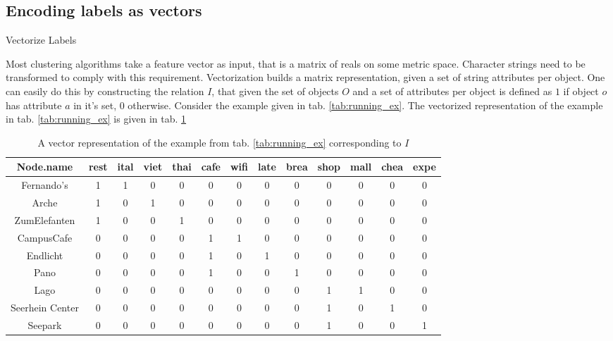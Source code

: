 \subsection{Encoding labels as vectors}
\begin{algorithm}[htp]
\caption{Vectorize Labels}\label{vect}
\end{algorithm} 
Most clustering algorithms take a feature vector as input, that is a matrix of reals on some metric space. Character strings need to be transformed to comply with this requirement. Vectorization builds a matrix representation, given a set of string attributes per object.
One can easily do this by constructing the relation $I$, that given the set of objects $O$ and a set of attributes per object is defined as $1$ if object $o$ has attribute $a$ in it's set, $0$ otherwise.
Consider the example given in tab. \ref{tab:running_ex}. The vectorized representation of the example in tab. \ref{tab:running_ex} is given in tab. \ref{tab:vect_running_ex}
\begin{table}[htp]
 \begin{adjustwidth}{-4cm}{0cm}  
     \centering
     \begin{tabular}{|c|c|c|c|c|c|c|c|c|c|c|c|c|} \hline
            Node.name & rest & ital & viet & thai & cafe & wifi & late & brea & shop & mall & chea & expe \\ \hline \hline
            Fernando's      & 1 & 1 & 0 & 0 & 0 & 0 & 0 & 0 & 0 & 0 & 0 & 0  \\  \hline
            Arche           & 1 & 0 & 1 & 0 & 0 & 0 & 0 & 0 & 0 & 0 & 0 & 0  \\  \hline
            ZumElefanten    & 1 & 0 & 0 & 1 & 0 & 0 & 0 & 0 & 0 & 0 & 0 & 0  \\ \hline
            CampusCafe      & 0 & 0 & 0 & 0 & 1 & 1 & 0 & 0 & 0 & 0 & 0 & 0 \\ \hline
            Endlicht        & 0 & 0 & 0 & 0 & 1 & 0 & 1 & 0 & 0 & 0 & 0 & 0 \\ \hline
            Pano            & 0 & 0 & 0 & 0 & 1 & 0 & 0 & 1 & 0 & 0 & 0 & 0 \\ \hline
            Lago            & 0 & 0 & 0 & 0 & 0 & 0 & 0 & 0 & 1 & 1 & 0 & 0 \\ \hline
            Seerhein Center & 0 & 0 & 0 & 0 & 0 & 0 & 0 & 0 & 1 & 0 & 1 & 0 \\ \hline
            Seepark         & 0 & 0 & 0 & 0 & 0 & 0 & 0 & 0 & 1 & 0 & 0 & 1\\ \hline
        \end{tabular}
    \caption{A vector representation of the example from tab. \ref{tab:running_ex} corresponding to $I$}
    \label{tab:vect_running_ex}
    \end{adjustwidth}
\end{table}{} \\


